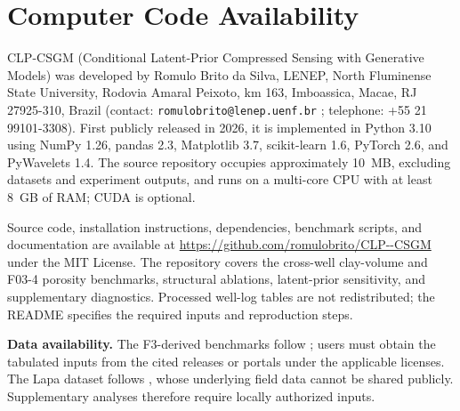 \documentclass[11pt]{article}
\theoremstyle{remark}
\begin{document}
\vspace{0.5em}
\section*{Computer Code Availability}

CLP-CSGM (Conditional Latent-Prior Compressed Sensing with Generative Models)
was developed by Romulo Brito da Silva, LENEP, North Fluminense State
University, Rodovia Amaral Peixoto, km 163, Imboassica, Macae,
RJ 27925-310, Brazil (contact: \texttt{romulobrito@lenep.uenf.br} ;
telephone: +55 21 99101-3308).
First publicly released in 2026, it is implemented in Python 3.10 using
NumPy 1.26, pandas 2.3, Matplotlib 3.7, scikit-learn 1.6, PyTorch 2.6,
and PyWavelets 1.4. The source repository occupies approximately 10~MB,
excluding datasets and experiment outputs, and runs on a multi-core CPU
with at least 8~GB of RAM; CUDA is optional.

Source code, installation instructions, dependencies, benchmark scripts,
and documentation are available at
\url{https://github.com/romulobrito/CLP--CSGM} under the MIT License.
The repository covers the cross-well clay-volume and F03-4 porosity
benchmarks, structural ablations, latent-prior sensitivity, and
supplementary diagnostics. Processed well-log tables are not redistributed;
the README specifies the required inputs and reproduction steps.

\vspace{0.35em}
\noindent\textbf{Data availability.}
The F3-derived benchmarks follow \citet{zhang2025rockphysicslogs}; users
must obtain the tabulated inputs from the cited releases or portals under
the applicable licenses. The Lapa dataset follows
\citet{alvarez2025nonlinear}, whose underlying field data cannot be shared
publicly. Supplementary analyses therefore require locally authorized inputs.










\clearpage



\clearpage
\appendix

\end{document}
